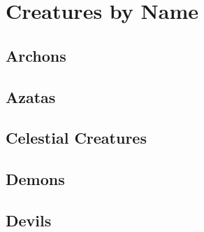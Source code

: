 \newpage

\section{Creatures by Name} 

\subsection{Archons}


\subsection{Azatas}

\subsection{Celestial Creatures}






























\subsection{Demons}


\subsection{Devils}

